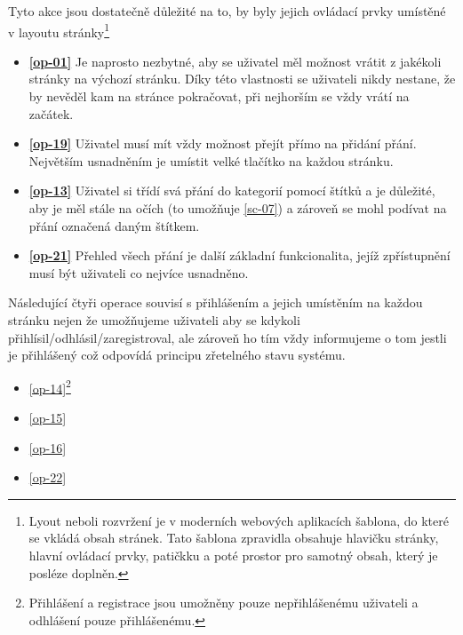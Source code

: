 Tyto akce jsou dostatečně důležité na to, by byly jejich ovládací prvky umístěné v layoutu stránky\footnote{Lyout neboli rozvržení je v moderních webových aplikacích šablona, do které se vkládá obsah stránek. Tato šablona zpravidla obsahuje hlavičku stránky, hlavní ovládací prvky, patičkku a poté prostor pro samotný obsah, který je posléze doplněn.}
\begin{itemize}
\item \textbf{\ref{op-01}} Je naprosto nezbytné, aby se uživatel měl možnost vrátit z jakékoli stránky na výchozí stránku\cite{molich1990improving}. Díky této vlastnosti se uživateli nikdy nestane, že by nevěděl kam na stránce pokračovat, při nejhorším se vždy vrátí na začátek.
\item \textbf{\ref{op-19}} Uživatel musí mít vždy možnost přejít přímo na přidání přání. Největším usnadněním je umístit velké tlačítko na každou stránku.
\item \textbf{\ref{op-13}} Uživatel si třídí svá přání do kategorií pomocí štítků a je důležité, aby je měl stále na očích (to umožňuje \ref{sc-07}) a zároveň se mohl podívat na přání označená daným štítkem.
\item \textbf{\ref{op-21}} Přehled všech přání je další základní funkcionalita, jejíž zpřístupnění musí být uživateli co nejvíce usnadněno.
\end{itemize}
Následující čtyři operace souvisí s přihlášením a jejich umístěním na každou stránku nejen že umožňujeme uživateli aby se kdykoli přihlísil/odhlásil/zaregistroval, ale zároveň ho tím vždy informujeme o tom jestli je přihlášený což odpovídá principu zřetelného stavu systému\cite{molich1990improving}.
\begin{multicols}{2}
\begin{itemize}
\item \ref{op-14}\footnote{Přihlášení a registrace jsou umožněny pouze nepřihlášenému uživateli a odhlášení pouze přihlášenému.\label{footnote-login}}
\item \ref{op-15}
\item \ref{op-16}
\item \ref{op-22}
\end{itemize}
\end{multicols}

